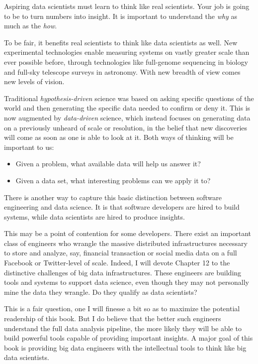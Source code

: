 \documentclass[10pt]{article}
\begin{document}
Aspiring data scientists must learn to think like real scientists. Your job is going to be to turn numbers into insight. It is important to understand the \textit{why} as much as the \textit{how}.

To be fair, it benefits real scientists to think like data scientists as well. New experimental technologies enable measuring systems on vastly greater scale than ever possible before, through technologies like full-genome sequencing in biology and full-sky telescope surveys in astronomy. With new breadth of view comes new levels of vision.

Traditional \textit{hypothesis-driven} science was based on asking specific questions of the world and then generating the specific data needed to confirm or deny it. This is now augmented by \textit{data-driven} science, which instead focuses on generating data on a previously unheard of scale or resolution, in the belief that new discoveries will come as soon as one is able to look at it. Both ways of thinking will be important to us:

\begin{itemize}
  \item Given a problem, what available data will help us answer it?
  \item Given a data set, what interesting problems can we apply it to?
\end{itemize}

There is another way to capture this basic distinction between software engineering and data science. It is that software developers are hired to build systems, while data scientists are hired to produce insights.

This may be a point of contention for some developers. There exist an important class of engineers who wrangle the massive distributed infrastructures necessary to store and analyze, say, financial transaction or social media data on a full Facebook or Twitter-level of scale. Indeed, I will devote Chapter 12 to the distinctive challenges of big data infrastructures. These engineers are building tools and systems to support data science, even though they may not personally mine the data they wrangle. Do they qualify as data scientists?

This is a fair question, one I will finesse a bit so as to maximize the potential readership of this book. But I do believe that the better such engineers understand the full data analysis pipeline, the more likely they will be able to build powerful tools capable of providing important insights. A major goal of this book is providing big data engineers with the intellectual tools to think like big data scientists.
\end{document}
